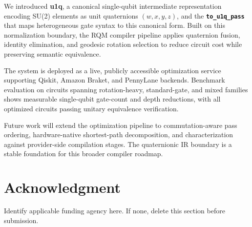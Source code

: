 \documentclass[conference]{IEEEtran}
\begin{document}
We introduced \textbf{u1q}, a canonical single-qubit intermediate representation encoding
SU(2) elements as unit quaternions $(w, x, y, z)$, and the \textbf{\texttt{to\_u1q\_pass}}
that maps heterogeneous gate syntax to this canonical form. Built on this normalization
boundary, the RQM compiler pipeline applies quaternion fusion, identity elimination, and
geodesic rotation selection to reduce circuit cost while preserving semantic equivalence.

The system is deployed as a live, publicly accessible optimization service supporting Qiskit,
Amazon Braket, and PennyLane backends. Benchmark evaluation on circuits spanning
rotation-heavy, standard-gate, and mixed families shows measurable single-qubit gate-count and
depth reductions, with all optimized circuits passing unitary equivalence verification.

Future work will extend the optimization pipeline to commutation-aware pass ordering,
hardware-native shortest-path decomposition, and characterization against provider-side
compilation stages. The quaternionic IR boundary is a stable foundation for this broader
compiler roadmap.

\section*{Acknowledgment}

Identify applicable funding agency here. If none, delete this section before submission.
\end{document}
